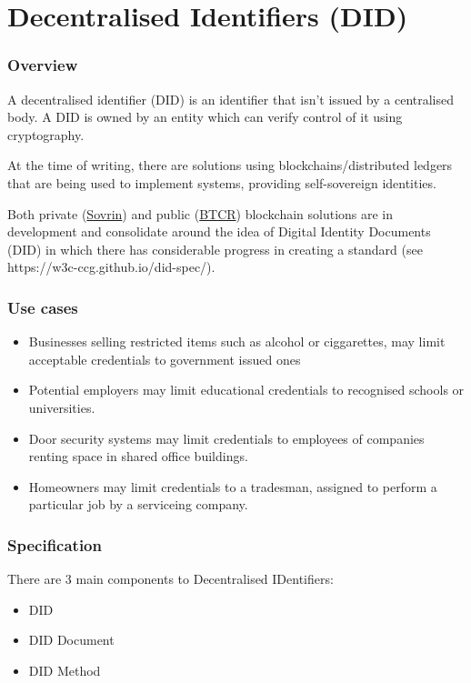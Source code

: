 \documentclass[10pt,a4paper]{runcrypto}
\begin{document}
\part{Decentralised Identifiers (DID)}

\section{Overview}
A decentralised identifier (DID) is an identifier that isn't issued by a centralised body.  A DID is owned by an entity which can verify control of it using cryptography.

At the time of writing, there are solutions using blockchains/distributed ledgers that are being used to implement systems, providing self-sovereign identities.

Both private (\href{https://sovrin.org/}{Sovrin}) and public (\href{https://w3c-ccg.github.io/didm-btcr/}{BTCR}) blockchain solutions are in development and consolidate around the idea of Digital Identity Documents (DID) in which there has considerable progress in creating a standard (see https://w3c-ccg.github.io/did-spec/).

\section{Use cases}
\begin{itemize}
	\item Businesses selling restricted items such as alcohol or ciggarettes, may limit acceptable credentials to government issued ones
    \item Potential employers may limit educational credentials to recognised schools or universities.
    \item Door security systems may limit credentials to employees of companies renting space in shared office buildings.
    \item Homeowners may limit credentials to a tradesman, assigned to perform a particular job by a serviceing company.
\end{itemize}

\section{Specification}

There are 3 main components to Decentralised IDentifiers:
\begin{itemize}
	\item DID
	\item DID Document
	\item DID Method
\end{itemize}
\end{document}
